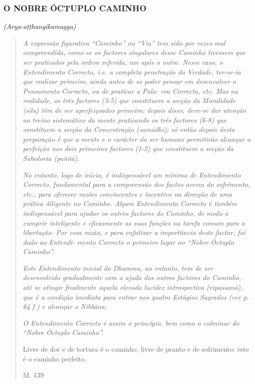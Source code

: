 \subsubsection{O NOBRE ÓCTUPLO CAMINHO}\label{o-nobre-uxf3ctuplo-caminho}

\emph{(Arya-aṭṭhangikamagga)}

\begin{quote}
\emph{A expressão figurativa ``Caminho'' ou ``Via'' tem sido por vezes mal compreendida, como se os factores singulares desse Caminho tivessem que ser praticados pela ordem referida, um após o outro. Nesse caso, o Entendimento Correcto, i.e. a completa penetração da Verdade, ter-se-ia que realizar primeiro, ainda antes de se poder pensar em desenvolver o Pensamento Correcto, ou de praticar a Pala- vra Correcta, etc. Mas na realidade, os três factores (3-5) que constituem a secção da Moralidade (sīla) têm de ser aperfeiçoados primeiro; depois disso, deve-se dar atenção ao treino sistemático da mente praticando os três factores (6-8) que constituem a secção da Concentração (samādhi); só então depois desta preparação é que a mente e o carácter do ser humano permitirão alcançar a perfeição nos dois primeiros factores (1-2) que constituem a secção da Sabedoria (paññā).}

\emph{No entanto, logo de início, é indispensável um mínimo de Entendimento Correcto, fundamental para a compreensão dos factos acerca do sofrimento, etc., para oferecer razões convincentes e incentivo na direcção de uma prática diligente no Caminho. Algum Entendimento Correcto é também indispensável para ajudar os outros factores do Caminho, de modo a cumprir inteligente e eficazmente as suas funções na tarefa comum para a libertação. Por essa razão, e para enfatizar a importância deste factor, foi dado ao Entendi- mento Correcto o primeiro lugar no ``Nobre Óctuplo Caminho''.}

\emph{Este Entendimento inicial do Dhamma, no entanto, tem de ser desenvolvido gradualmente com a ajuda dos outros factores do Caminho, até se atingir finalmente aquela elevada lucidez introspectiva (vipassanā), que é a condição imediata para entrar nos quatro Estágios Sagrados (ver p. 64 f.) e alcançar o Nibbāna.}

\emph{O Entendimento Correcto é assim o princípio, bem como o culminar do ``Nobre Óctuplo Caminho''.}

Livre de dor e de tortura é o caminho, livre de pranto e de sofrimento: este é o caminho perfeito.

M. 139


\end{quote}
